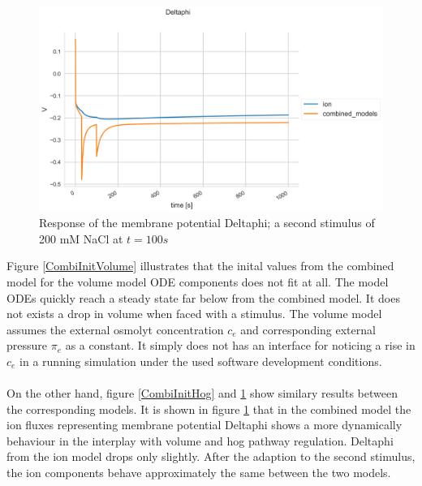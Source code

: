 \begin{figure}[h!]
	\begin{center}
		\begin{minipage}{0,8\textwidth}
			
			\includegraphics[width=\textwidth]{picture/Deltaphi_71.png}
			\caption{Response of the membrane potential Deltaphi; a second stimulus of 200 mM NaCl at $t=100s$ } 
			\label{CombiInitIon} 
		\end{minipage}
	\end{center}
\end{figure}
Figure \ref{CombiInitVolume} illustrates that the inital values from the combined model for the volume model ODE components does not fit at all. The model 
ODEs quickly reach a steady state far below from the combined model. It does not exists a drop in volume when faced with a stimulus. The volume model assumes the external osmolyt concentration $c_e$ and corresponding external pressure $\pi_e$ as a constant. It simply does not has an interface for noticing a rise in $c_e$ in a running simulation under the used software development conditions.\\\\
On the other hand, figure \ref{CombiInitHog} and \ref{CombiInitIon} show similary results between the corresponding models. It is shown in figure \ref{CombiInitIon} that in the combined model the ion fluxes representing membrane potential Deltaphi shows a more dynamically behaviour in the interplay with volume and hog pathway regulation. Deltaphi from the ion model drops only slightly. After the adaption to the second stimulus, the ion components behave approximately the same between the two models.\\

\newpage
